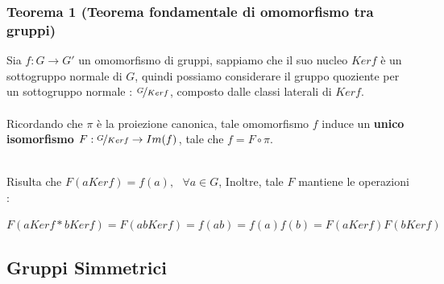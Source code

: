 \documentclass[12pt, letterpaper]{article}
\begin{document}
 \subsubsection{Teorema 1 (Teorema fondamentale di omomorfismo tra gruppi)}
 Sia \(f:G\rightarrow G'\) un omomorfismo di gruppi, sappiamo che il suo 
 nucleo \(Kerf\) è un sottogruppo normale di \(G\), quindi possiamo considerare il gruppo quoziente 
 per un sottogruppo normale : \(\nicefrac{G}{Kerf}\), composto dalle classi laterali di \(Kerf\).\\\hphantom{}\\
 Ricordando che \(\pi\) è la proiezione canonica, tale omomorfismo 
 \(f\) induce un \textbf{unico isomorfismo} \(F:\nicefrac{G}{Kerf}\rightarrow Im(f)\), 
 tale che \(f=F \circ\pi\).
 \begin{figure}[h]
\end{figure}
\\Risulta che \(F(aKerf)=f(a),\text{ }\forall a\in G\), Inoltre,
tale \(F\) mantiene le operazioni :\begin{center} \(F(aKerf*bKerf)=F(abKerf)=f(ab)=f(a)f(b)=F(aKerf)F(bKerf)\)\end{center}
\subsection{Gruppi Simmetrici}\label{gruppSim}
\end{document}
